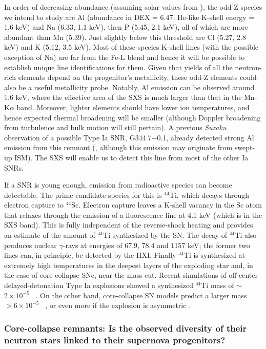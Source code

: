 \documentclass[11pt,a4paper]{article}
\begin{document}
In order of decreasing abundance (assuming solar values from
\citealt{ag89}), the odd-Z species we intend to study are Al
(abundance in DEX = 6.47; He-like K-shell energy = 1.6 keV) and Na
(6.33, 1.1 keV), then P (5.45, 2.1 keV), all of which are more
abundant than Mn (5.39).  Just slightly below this threshold are Cl
(5.27, 2.8 keV) and K (5.12, 3.5 keV). Most of these species K-shell
lines (with the possible exception of Na) are far from the Fe-L blend
and hence it will be possible to establish unique line identifications
for them.  Given that yields of all the neutron-rich elements depend
on the progenitor's metallicity, these odd-Z elements could also be a
useful metallicity probe. Notably, Al emission can be observed around
1.6 keV, where the effective area of the SXS is much larger than that
in the Mn-K$\alpha$ band. Moreover, lighter elements should have lower
ion temperatures, and hence expected thermal broadening will be
smaller (although Doppler broadening from turbulence and bulk motion
will still pertain). A previous {\it Suzaku} observation of a possible Type
Ia SNR, G344.7$-$0.1, already detected strong Al emission from this
remnant (\citealt{yamaguchi12}, although this emission may originate
from swept-up ISM). The SXS will enable us to detect this line from
most of the other Ia SNRs.


If a SNR is young enough, emission from radioactive species can become
detectable. The prime candidate species for this is $^{44}$Ti, which
decays through electron capture to $^{44}$Sc. Electron capture leaves
a K-shell vacancy in the Sc atom that relaxes through the emission of
a fluorescence line at 4.1 keV (which is in the SXS band).  This is fully independent of the
reverse-shock heating and provides an estimate of the amount of
$^{44}$Ti synthesized by the SN. The decay of $^{44}$Ti also produces
nuclear $\gamma$-rays at energies of 67.9, 78.4 and 1157 keV; the
former two lines can, in principle, be detected by the HXI.  Finally
$^{44}$Ti is synthesized at extremely high temperatures in the deepest
layers of the exploding star and, in the case of core-collapse SNe, near the mass
cut.  Recent simulations of off-center delayed-detonation Type Ia
explosions showed a synthesized $^{44}$Ti mass of $\sim$$2 \times
10^{-5}$ \msun\ \citep{maeda10b}. On the other hand, core-collapse SN
models predict a larger mass $> 6 \times 10^{-5}$ \msun\ \citep{timmes96},
or even more if the explosion is asymmetric \citep{nagataki98}.


\subsubsection{Core-collapse remnants: Is the observed diversity of their
 neutron stars linked to their supernova progenitors?}
\end{document}
